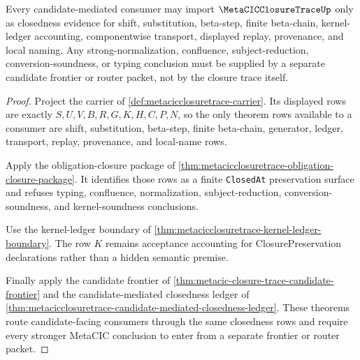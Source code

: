\begin{theorem}
\label{thm:metacicclosuretrace-candidate-closedness-interface}
Every candidate-mediated consumer may import $\MetaCICClosureTraceUp$ only as closedness evidence for shift, substitution, beta-step, finite beta-chain, kernel-ledger accounting, componentwise transport, displayed replay, provenance, and local naming. Any strong-normalization, confluence, subject-reduction, conversion-soundness, or typing conclusion must be supplied by a separate candidate frontier or router packet, not by the closure trace itself.
\end{theorem}
\begin{proof}
Project the carrier of \autoref{def:metacicclosuretrace-carrier}. Its displayed rows are exactly $S,U,V,B,R,G,K,H,C,P,N$, so the only theorem rows available to a consumer are shift, substitution, beta-step, finite beta-chain, generator, ledger, transport, replay, provenance, and local-name rows.

Apply the obligation-closure package of \autoref{thm:metacicclosuretrace-obligation-closure-package}. It identifies those rows as a finite \texttt{ClosedAt} preservation surface and refuses typing, confluence, normalization, subject-reduction, conversion-soundness, and kernel-soundness conclusions.

Use the kernel-ledger boundary of \autoref{thm:metacicclosuretrace-kernel-ledger-boundary}. The row $K$ remains acceptance accounting for ClosurePreservation declarations rather than a hidden semantic premise.

Finally apply the candidate frontier of \autoref{thm:metacic-closure-trace-candidate-frontier} and the candidate-mediated closedness ledger of \autoref{thm:metacicclosuretrace-candidate-mediated-closedness-ledger}. These theorems route candidate-facing consumers through the same closedness rows and require every stronger MetaCIC conclusion to enter from a separate frontier or router packet.
\end{proof}

